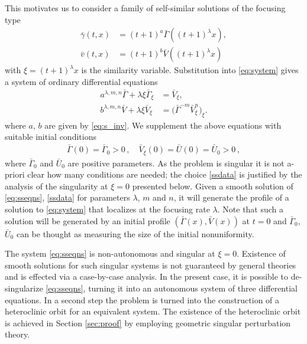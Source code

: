 \documentclass[a4paper,11pt]{article}
\def\bG{\bar{\Gamma}}
\def\bV{\bar{V}}
\def\bU{\bar{U}}
\numberwithin{step}{dummy}
\begin{document}
This motivates us to consider a family of self-similar solutions of the focusing type
\begin{equation} \label{eq:ss}
\begin{aligned}
 \bar{ \gamma }(t,x) &= (t+1)^a\bG((t+1)^ \lambda x),\\
 \bar{v}(t,x)&=  (t+1)^b\bV((t+1)^ \lambda x)
\end{aligned}
\end{equation}
with $\xi=(t+1)^ \lambda x$ is the similarity variable. Substitution into \eqref{eq:system} gives a system of ordinary differential equations
\begin{equation} \label{eq:sseqns}
 \begin{split}
 a^{\lambda,m,n}\bG + \lambda \xi \bG_\xi &= \bV_\xi,\\
 b^{\lambda,m,n}\bV + \lambda \xi \bV_\xi &= \big(\bG^{-m}\bV_\xi^n\big)_\xi.
 \end{split}
\end{equation}
where $a$, $b$ are given by \eqref{eq:s_inv}. 
We supplement the above equations with suitable initial conditions
\begin{align}
\label{ssdata}
 \bG(0) = \bG_0  > 0 \, , \quad \bV_{\xi} (0)  = \bU(0) = \bU_0  > 0 \, , 
 \end{align}
where $\bG_0$ and $\bU_0$ are positive parameters. As the problem is singular it is not a-priori clear how many conditions are needed;
the choice \eqref{ssdata} is justified by the analysis of the singularity at $\xi = 0$ presented below.
Given a  smooth solution of \eqref{eq:sseqns}, \eqref{ssdata} for parameters $\lambda$, $m$ and $n$, it will generate the profile  of a solution to \eqref{eq:system} that localizes 
at the focusing rate $\lambda$. Note that such a solution will be generated by an initial profile
$(\bG(x), \bV(x))$ at $t = 0$ and $\bG_0$, $\bU_0$ can be thought as measuring the size of the initial nonuniformity.

The system \eqref{eq:sseqns} is non-autonomous and singular at $\xi=0$. 
Existence of smooth solutions for such singular systems is not guaranteed by general theories and is effected via a case-by-case analysis. 
In the present case, it is possible to de-singularize \eqref{eq:sseqns}, turning it into an autonomous system of three differential equations. 
In a second step the problem is turned into the construction of a heteroclinic orbit for an equivalent system. 
The existence of the heteroclinic orbit is achieved in Section \ref{sec:proof} by employing geometric singular perturbation theory.
\end{document}
